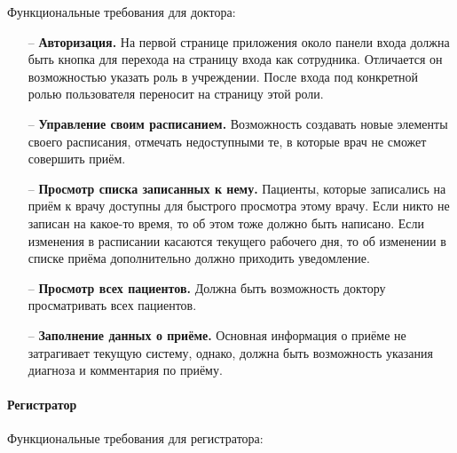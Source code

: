 \documentclass[a4paper,article]{article}
\begin{document}
\begin{sloppypar}
    Функциональные требования для доктора:
        \begin{itemize}[nolistsep]
            \item[--] \textbf{Авторизация.} На первой странице приложения около панели входа должна быть кнопка для перехода на страницу входа как сотрудника. Отличается он возможностью указать роль в учреждении. После входа под конкретной ролью пользователя переносит на страницу этой роли.
            \item[--] \textbf{Управление своим расписанием.} Возможность создавать новые элементы своего расписания, отмечать недоступными те, в которые врач не сможет совершить приём.
            \item[--] \textbf{Просмотр списка записанных к нему.} Пациенты, которые записались на приём к врачу доступны для быстрого просмотра этому врачу. Если никто не записан на какое-то время, то об этом тоже должно быть написано. Если изменения в расписании касаются текущего рабочего дня, то об изменении в списке приёма дополнительно должно приходить уведомление.
            \item[--] \textbf{Просмотр всех пациентов.} Должна быть возможность доктору просматривать всех пациентов.
            \item[--] \textbf{Заполнение данных о приёме.} Основная информация о приёме не затрагивает текущую систему, однако, должна быть возможность указания диагноза и комментария по приёму.
        \end{itemize}


    \paragraph{Регистратор}\label{ТЗ. Регистратор}

    Функциональные требования для регистратора:


\end{sloppypar}
\end{document}

